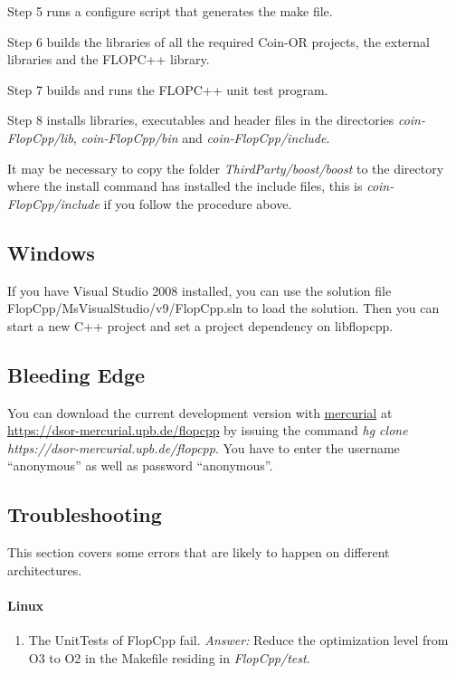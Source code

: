 \documentclass[a4paper,10pt,pdftex]{scrartcl}
\begin{document}
Step 5 runs a configure script that generates the make file. 

Step 6 builds the libraries of all the required Coin-OR projects, the external libraries and the FLOPC++ library. 

Step 7 builds and runs the FLOPC++ unit test program. 

Step 8 installs libraries, executables and header files in the directories \emph{coin-FlopCpp/lib}, \emph{coin-FlopCpp/bin} and \emph{coin-FlopCpp/include}.

It may be necessary to copy the folder \emph{ThirdParty/boost/boost} to the directory where the install command has installed the include files, this is \emph{coin-FlopCpp/include} if you follow the procedure above.

 \subsection{Windows}
If you have Visual Studio 2008 installed, you can use the solution file FlopCpp/MsVisualStudio/v9/FlopCpp.sln to load the solution. Then you can start a new C++ project and set a project dependency on libflopcpp.
 \subsection{Bleeding Edge}
You can download the current development version with \href{http://mercurial.selenic.com/}{mercurial} at \href{https://dsor-mercurial.upb.de/flopcpp}{https://dsor-mercurial.upb.de/flopcpp} by issuing the command \emph{hg clone https://dsor-mercurial.upb.de/flopcpp}.
You have to enter the username ``anonymous'' as well as password ``anonymous''.

\subsection{Troubleshooting}
This section covers some errors that are likely to happen on different architectures.

\paragraph{Linux}
\begin{enumerate}
 \item The UnitTests of FlopCpp fail. \emph{Answer: } Reduce the optimization level from O3 to O2 in the Makefile residing in \emph{FlopCpp/test}.
\end{enumerate}
\end{document}
